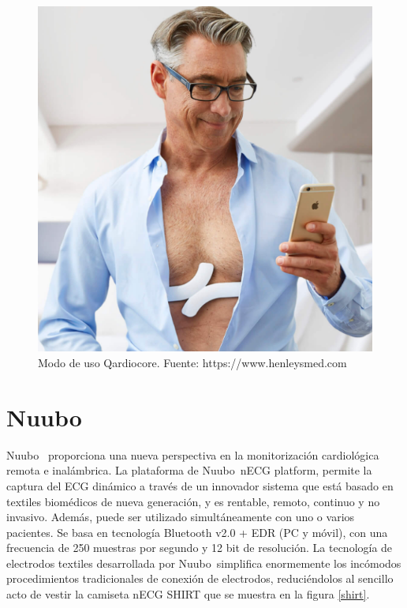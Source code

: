 \begin{figure}[H]
	\centering
	\includegraphics[scale=0.5]{figuras/estadoarte/qardio/wear.png}
	\caption{Modo de uso Qardiocore\textregistered. Fuente: https://www.henleysmed.com}
	\label{qardio2}
\end{figure}

\section{Nuubo\textregistered}

Nuubo\textregistered\ \cite{nuubo} proporciona una nueva perspectiva en la monitorización cardiológica remota e inalámbrica. La plataforma de Nuubo\textregistered\, nECG platform, permite la captura del ECG dinámico a través de un innovador sistema que está basado en textiles biomédicos de nueva generación, y es rentable, remoto, continuo y no invasivo. Además, puede ser utilizado simultáneamente con uno o varios pacientes. Se basa en tecnología Bluetooth v2.0 + EDR (PC y móvil), con una frecuencia de 250 muestras por segundo y 12 bit de resolución\cite{nuubo_tel}.
La tecnología de electrodos textiles desarrollada por Nuubo\textregistered\ simplifica enormemente los incómodos procedimientos tradicionales de conexión de electrodos, reduciéndolos al sencillo acto de vestir la camiseta nECG SHIRT que se muestra en la figura \ref{shirt}.

